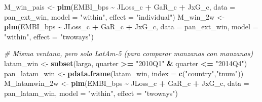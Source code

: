 \documentclass[
]{article}
\newenvironment{Shaded}{\begin{snugshade}}{\end{snugshade}}
\newcommand{\AttributeTok}[1]{\textcolor[rgb]{0.13,0.29,0.53}{#1}}
\newcommand{\CommentTok}[1]{\textcolor[rgb]{0.56,0.35,0.01}{\textit{#1}}}
\newcommand{\FunctionTok}[1]{\textcolor[rgb]{0.13,0.29,0.53}{\textbf{#1}}}
\newcommand{\NormalTok}[1]{#1}
\newcommand{\OtherTok}[1]{\textcolor[rgb]{0.56,0.35,0.01}{#1}}
\newcommand{\SpecialCharTok}[1]{\textcolor[rgb]{0.81,0.36,0.00}{\textbf{#1}}}
\newcommand{\StringTok}[1]{\textcolor[rgb]{0.31,0.60,0.02}{#1}}
\begin{document}
\begin{Shaded}
\begin{Highlighting}[]
\NormalTok{M\_win\_pais }\OtherTok{\textless{}{-}} \FunctionTok{plm}\NormalTok{(EMBI\_bps }\SpecialCharTok{\textasciitilde{}}\NormalTok{ JLoss\_c }\SpecialCharTok{+}\NormalTok{ GaR\_c }\SpecialCharTok{+}\NormalTok{ JxG\_c, }\AttributeTok{data =}\NormalTok{ pan\_ext\_win, }\AttributeTok{model =} \StringTok{"within"}\NormalTok{, }\AttributeTok{effect =} \StringTok{"individual"}\NormalTok{)}
\NormalTok{M\_win\_2w   }\OtherTok{\textless{}{-}} \FunctionTok{plm}\NormalTok{(EMBI\_bps }\SpecialCharTok{\textasciitilde{}}\NormalTok{ JLoss\_c }\SpecialCharTok{+}\NormalTok{ GaR\_c }\SpecialCharTok{+}\NormalTok{ JxG\_c, }\AttributeTok{data =}\NormalTok{ pan\_ext\_win, }\AttributeTok{model =} \StringTok{"within"}\NormalTok{, }\AttributeTok{effect =} \StringTok{"twoways"}\NormalTok{)}

\CommentTok{\# Misma ventana, pero solo LatAm{-}5 (para comparar manzanas con manzanas)}
\NormalTok{latam\_win }\OtherTok{\textless{}{-}} \FunctionTok{subset}\NormalTok{(larga, quarter }\SpecialCharTok{\textgreater{}=} \StringTok{"2010Q1"} \SpecialCharTok{\&}\NormalTok{ quarter }\SpecialCharTok{\textless{}=} \StringTok{"2014Q4"}\NormalTok{)}
\NormalTok{pan\_latam\_win }\OtherTok{\textless{}{-}} \FunctionTok{pdata.frame}\NormalTok{(latam\_win, }\AttributeTok{index =} \FunctionTok{c}\NormalTok{(}\StringTok{"country"}\NormalTok{,}\StringTok{"tnum"}\NormalTok{))}
\NormalTok{M\_latamwin\_2w }\OtherTok{\textless{}{-}} \FunctionTok{plm}\NormalTok{(EMBI\_bps }\SpecialCharTok{\textasciitilde{}}\NormalTok{ JLoss\_c }\SpecialCharTok{+}\NormalTok{ GaR\_c }\SpecialCharTok{+}\NormalTok{ JxG\_c, }\AttributeTok{data =}\NormalTok{ pan\_latam\_win, }\AttributeTok{model =} \StringTok{"within"}\NormalTok{, }\AttributeTok{effect =} \StringTok{"twoways"}\NormalTok{)}


\end{Highlighting}
\end{Shaded}
\end{document}
